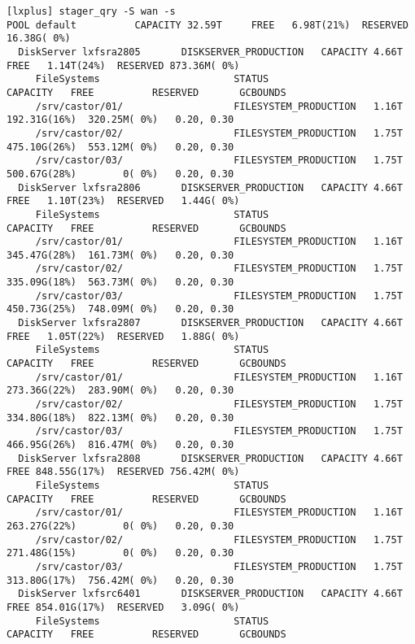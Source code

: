 \begin{verbatim}
[lxplus] stager_qry -S wan -s
POOL default          CAPACITY 32.59T     FREE   6.98T(21%)  RESERVED  16.38G( 0%)
  DiskServer lxfsra2805       DISKSERVER_PRODUCTION   CAPACITY 4.66T      FREE   1.14T(24%)  RESERVED 873.36M( 0%)
     FileSystems                       STATUS                  CAPACITY   FREE          RESERVED       GCBOUNDS
     /srv/castor/01/                   FILESYSTEM_PRODUCTION   1.16T      192.31G(16%)  320.25M( 0%)   0.20, 0.30
     /srv/castor/02/                   FILESYSTEM_PRODUCTION   1.75T      475.10G(26%)  553.12M( 0%)   0.20, 0.30
     /srv/castor/03/                   FILESYSTEM_PRODUCTION   1.75T      500.67G(28%)        0( 0%)   0.20, 0.30
  DiskServer lxfsra2806       DISKSERVER_PRODUCTION   CAPACITY 4.66T      FREE   1.10T(23%)  RESERVED   1.44G( 0%)
     FileSystems                       STATUS                  CAPACITY   FREE          RESERVED       GCBOUNDS
     /srv/castor/01/                   FILESYSTEM_PRODUCTION   1.16T      345.47G(28%)  161.73M( 0%)   0.20, 0.30
     /srv/castor/02/                   FILESYSTEM_PRODUCTION   1.75T      335.09G(18%)  563.73M( 0%)   0.20, 0.30
     /srv/castor/03/                   FILESYSTEM_PRODUCTION   1.75T      450.73G(25%)  748.09M( 0%)   0.20, 0.30
  DiskServer lxfsra2807       DISKSERVER_PRODUCTION   CAPACITY 4.66T      FREE   1.05T(22%)  RESERVED   1.88G( 0%)
     FileSystems                       STATUS                  CAPACITY   FREE          RESERVED       GCBOUNDS
     /srv/castor/01/                   FILESYSTEM_PRODUCTION   1.16T      273.36G(22%)  283.90M( 0%)   0.20, 0.30
     /srv/castor/02/                   FILESYSTEM_PRODUCTION   1.75T      334.80G(18%)  822.13M( 0%)   0.20, 0.30
     /srv/castor/03/                   FILESYSTEM_PRODUCTION   1.75T      466.95G(26%)  816.47M( 0%)   0.20, 0.30
  DiskServer lxfsra2808       DISKSERVER_PRODUCTION   CAPACITY 4.66T      FREE 848.55G(17%)  RESERVED 756.42M( 0%)
     FileSystems                       STATUS                  CAPACITY   FREE          RESERVED       GCBOUNDS
     /srv/castor/01/                   FILESYSTEM_PRODUCTION   1.16T      263.27G(22%)        0( 0%)   0.20, 0.30
     /srv/castor/02/                   FILESYSTEM_PRODUCTION   1.75T      271.48G(15%)        0( 0%)   0.20, 0.30
     /srv/castor/03/                   FILESYSTEM_PRODUCTION   1.75T      313.80G(17%)  756.42M( 0%)   0.20, 0.30
  DiskServer lxfsrc6401       DISKSERVER_PRODUCTION   CAPACITY 4.66T      FREE 854.01G(17%)  RESERVED   3.09G( 0%)
     FileSystems                       STATUS                  CAPACITY   FREE          RESERVED       GCBOUNDS

\end{verbatim}
